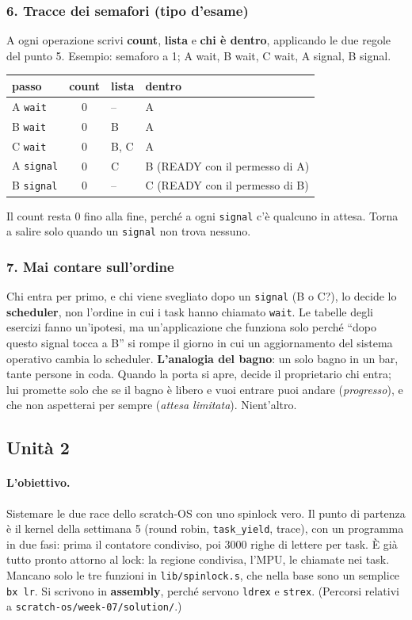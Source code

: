 \subsubsection*{6. Tracce dei semafori (tipo d'esame)}
A ogni operazione scrivi \textbf{count}, \textbf{lista} e \textbf{chi è dentro}, applicando le due regole del punto 5. Esempio: semaforo a 1; A wait, B wait, C wait, A signal, B signal.
\begin{center}
\small
\begin{tabular}{l c l l}
    \hline
    \textbf{passo} & \textbf{count} & \textbf{lista} & \textbf{dentro} \\
    \hline
    A \texttt{wait} & 0 & -- & A \\
    B \texttt{wait} & 0 & B & A \\
    C \texttt{wait} & 0 & B, C & A \\
    A \texttt{signal} & 0 & C & B (READY con il permesso di A) \\
    B \texttt{signal} & 0 & -- & C (READY con il permesso di B) \\
    \hline
\end{tabular}
\end{center}
Il count resta 0 fino alla fine, perché a ogni \texttt{signal} c'è qualcuno in attesa. Torna a salire solo quando un \texttt{signal} non trova nessuno.

\subsubsection*{7. Mai contare sull'ordine}
Chi entra per primo, e chi viene svegliato dopo un \texttt{signal} (B o C?), lo decide lo \textbf{scheduler}, non l'ordine in cui i task hanno chiamato \texttt{wait}. Le tabelle degli esercizi fanno un'ipotesi, ma un'applicazione che funziona solo perché ``dopo questo signal tocca a B'' si rompe il giorno in cui un aggiornamento del sistema operativo cambia lo scheduler. \textbf{L'analogia del bagno}: un solo bagno in un bar, tante persone in coda. Quando la porta si apre, decide il proprietario chi entra; lui promette solo che se il bagno è libero e vuoi entrare puoi andare (\emph{progresso}), e che non aspetterai per sempre (\emph{attesa limitata}). Nient'altro.

\subsection{Unità 2}
\paragraph*{L'obiettivo.} Sistemare le due race dello scratch-OS con uno spinlock vero. Il punto di partenza è il kernel della settimana 5 (round robin, \texttt{task\_yield}, trace), con un programma in due fasi: prima il contatore condiviso, poi 3000 righe di lettere per task. È già tutto pronto attorno al lock: la regione condivisa, l'MPU, le chiamate nei task. Mancano solo le tre funzioni in \texttt{lib/spinlock.s}, che nella base sono un semplice \texttt{bx lr}. Si scrivono in \textbf{assembly}, perché servono \texttt{ldrex} e \texttt{strex}. (Percorsi relativi a \texttt{scratch-os/week-07/solution/}.)

